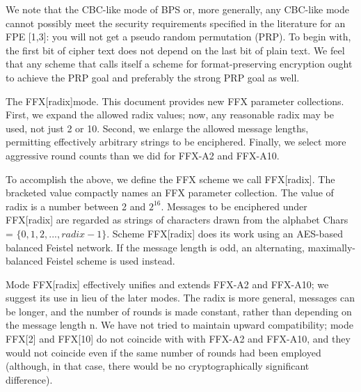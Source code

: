 We note that the CBC-like mode of BPS or, more generally, any CBC-like mode cannot possibly meet the security requirements specified in the literature for an FPE [1,3]: you will not get a pseudo random permutation (PRP). To begin with, the first bit of cipher text does not depend on the last bit of plain text. We feel that any scheme that calls itself a scheme for format-preserving encryption ought to achieve the PRP goal and preferably the strong PRP goal as well.

The FFX[radix]mode. This document provides new FFX parameter collections. First, we expand the allowed radix values; now, any reasonable radix may be used, not just 2 or 10. Second, we enlarge the allowed message lengths, permitting effectively arbitrary strings to be enciphered. Finally, we select more aggressive round counts than we did for FFX-A2 and FFX-A10.

To accomplish the above, we define the FFX scheme we call FFX[radix]. The bracketed value compactly names an FFX parameter collection. The value of radix is a number between 2 and $2^{16}$. Messages to be enciphered under FFX[radix] are regarded as strings of characters drawn from the alphabet Chars = $\{0,1,2,...,radix-1\}$. Scheme FFX[radix] does its work using an AES-based balanced Feistel network. If the message length is odd, an alternating, maximally-balanced Feistel scheme is used instead.

Mode FFX[radix] effectively unifies and extends FFX-A2 and FFX-A10; we suggest its use in lieu of the later modes. The radix is more general, messages can be longer, and the number of rounds is made constant, rather than depending on the message length n. We have not tried to maintain upward compatibility; mode FFX[2] and FFX[10] do not coincide with with FFX-A2 and FFX-A10, and they would not coincide even if the same number of rounds had been employed (although, in that case, there would be no cryptographically significant difference).

